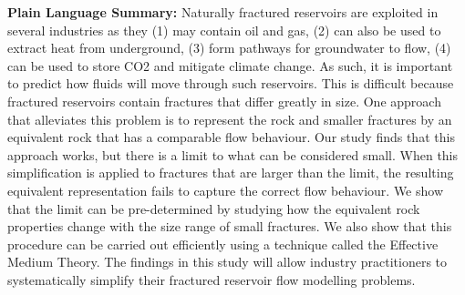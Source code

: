 \documentclass[draft]{agujournal2018}
\begin{document}
\textbf{Plain Language Summary:} Naturally fractured reservoirs are exploited in several industries as they (1) may contain oil and gas, (2) can also be used to extract heat from underground, (3) form pathways for groundwater to flow, (4) can be used to store CO2 and mitigate climate change. As such, it is important to predict how fluids will move through such reservoirs. This is difficult because fractured reservoirs contain fractures that differ greatly in size. One approach that alleviates this problem is to represent the rock and smaller fractures by an equivalent rock that has a comparable flow behaviour. Our study finds that this approach works, but there is a limit to what can be considered small. When this simplification is applied to fractures that are larger than the limit, the resulting equivalent representation fails to capture the correct flow behaviour. We show that the limit can be pre-determined by studying how the equivalent rock properties change with the size range of small fractures. We also show that this procedure can be carried out efficiently using a technique called the Effective Medium Theory. The findings in this study will allow industry practitioners to systematically simplify their fractured reservoir flow modelling problems.



%
%

%


%
%
%
%
\end{document}

